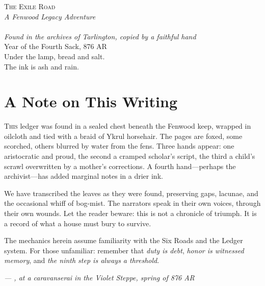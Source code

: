 \documentclass[11pt,a5paper]{book}
\begin{document}


\frontmatter
\thispagestyle{empty}
\begin{center}
\vspace*{2cm}
{\Huge\scshape The Exile Road}\\[1em]
{\Large\textit{A Fenwood Legacy Adventure}}\\[2em]
{\large\gray}\\[0.5em]
{\normalsize\textit{Found in the archives of Tarlington, copied by a faithful hand}}\\[2em]
\vfill
{\small Year of the Fourth Sack, 876 AR}\\[1em]
{\small Under the lamp, bread and salt.\\The ink is ash and rain.}
\end{center}

\clearpage

\tableofcontents

\clearpage

\chapter*{A Note on This Writing}

\lettrine{T}{his} ledger was found in a sealed chest beneath the Fenwood keep, wrapped in oilcloth and tied with a braid of Ykrul horsehair. The pages are foxed, some scorched, others blurred by water from the fens. Three hands appear: one aristocratic and proud, the second a cramped scholar's script, the third a child's scrawl overwritten by a mother's corrections. A fourth hand---perhaps the archivist---has added marginal notes in a drier ink.

We have transcribed the leaves as they were found, preserving gaps, lacunae, and the occasional whiff of bog-mist. The narrators speak in their own voices, through their own wounds. Let the reader beware: this is not a chronicle of triumph. It is a record of what a house must bury to survive.

The mechanics herein assume familiarity with the Six Roads and the Ledger system. For those unfamiliar: remember that \textit{duty is debt}, \textit{honor is witnessed memory}, and \textit{the ninth step is always a threshold}.

\vspace{1em}
\noindent\textit{--- \dusana, at a caravanserai in the Violet Steppe, spring of 876 AR}

\mainmatter
\end{document}
